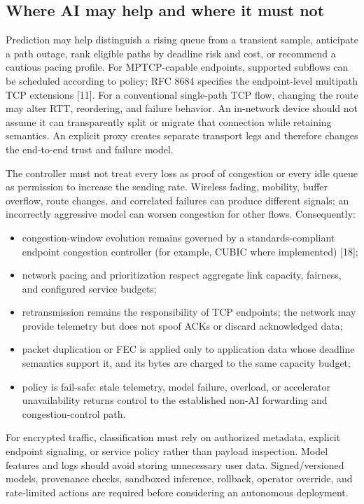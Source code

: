 \documentclass[
  american,
  11pt,
]{article}
\providecommand{\tightlist}{%
  \setlength{\itemsep}{0pt}\setlength{\parskip}{0pt}}
\begin{document}
\subsection{Where AI may help and where it must
not}\label{where-ai-may-help-and-where-it-must-not}

Prediction may help distinguish a rising queue from a transient sample,
anticipate a path outage, rank eligible paths by deadline risk and cost,
or recommend a cautious pacing profile. For MPTCP-capable endpoints,
supported subflows can be scheduled according to policy; RFC 8684
specifies the endpoint-level multipath TCP extensions {[}11{]}. For a
conventional single-path TCP flow, changing the route may alter RTT,
reordering, and failure behavior. An in-network device should not assume
it can transparently split or migrate that connection while retaining
semantics. An explicit proxy creates separate transport legs and
therefore changes the end-to-end trust and failure model.

The controller must not treat every loss as proof of congestion or every
idle queue as permission to increase the sending rate. Wireless fading,
mobility, buffer overflow, route changes, and correlated failures can
produce different signals; an incorrectly aggressive model can worsen
congestion for other flows. Consequently:

\begin{itemize}
\tightlist
\item
  congestion-window evolution remains governed by a standards-compliant
  endpoint congestion controller (for example, CUBIC where implemented)
  {[}18{]};
\item
  network pacing and prioritization respect aggregate link capacity,
  fairness, and configured service budgets;
\item
  retransmission remains the responsibility of TCP endpoints; the
  network may provide telemetry but does not spoof ACKs or discard
  acknowledged data;
\item
  packet duplication or FEC is applied only to application data whose
  deadline semantics support it, and its bytes are charged to the same
  capacity budget;
\item
  policy is fail-safe: stale telemetry, model failure, overload, or
  accelerator unavailability returns control to the established non-AI
  forwarding and congestion-control path.
\end{itemize}

For encrypted traffic, classification must rely on authorized metadata,
explicit endpoint signaling, or service policy rather than payload
inspection. Model features and logs should avoid storing unnecessary
user data. Signed/versioned models, provenance checks, sandboxed
inference, rollback, operator override, and rate-limited actions are
required before considering an autonomous deployment.
\end{document}
